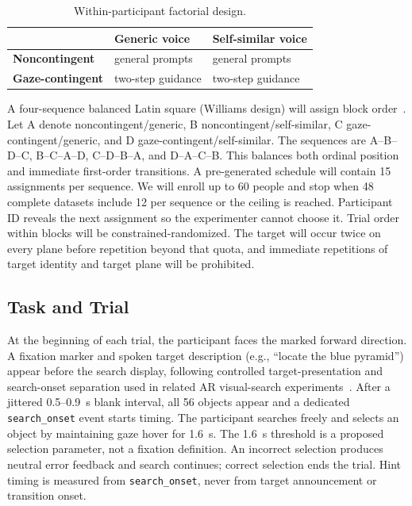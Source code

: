 \documentclass[10pt,journal,compsoc]{IEEEtran}
\begin{document}
\begin{table}[t]
\caption{Within-participant factorial design.}
\label{tab:design}
\centering
\begin{tabular}{lll}
\toprule
& \textbf{Generic voice} & \textbf{Self-similar voice} \\
\midrule
\textbf{Noncontingent} & general prompts & general prompts \\
\textbf{Gaze-contingent} & two-step guidance & two-step guidance \\
\bottomrule
\end{tabular}
\end{table}

A four-sequence balanced Latin square (Williams design) will assign block order~\cite{williams1949residual}. Let A denote noncontingent/generic, B noncontingent/self-similar, C gaze-contingent/generic, and D gaze-contingent/self-similar. The sequences are A--B--D--C, B--C--A--D, C--D--B--A, and D--A--C--B. This balances both ordinal position and immediate first-order transitions. A pre-generated schedule will contain 15 assignments per sequence. We will enroll up to 60 people and stop when 48 complete datasets include 12 per sequence or the ceiling is reached. Participant ID reveals the next assignment so the experimenter cannot choose it. Trial order within blocks will be constrained-randomized. The target will occur twice on every plane before repetition beyond that quota, and immediate repetitions of target identity and target plane will be prohibited.

\subsection{Task and Trial}
At the beginning of each trial, the participant faces the marked forward direction. A fixation marker and spoken target description (e.g., ``locate the blue pyramid'') appear before the search display, following controlled target-presentation and search-onset separation used in related AR visual-search experiments~\cite{zhang2023seehear,chiossi2024searching}. After a jittered 0.5--0.9~s blank interval, all 56 objects appear and a dedicated \texttt{search\_onset} event starts timing. The participant searches freely and selects an object by maintaining gaze hover for 1.6~s. The 1.6~s threshold is a proposed selection parameter, not a fixation definition. An incorrect selection produces neutral error feedback and search continues; correct selection ends the trial. Hint timing is measured from \texttt{search\_onset}, never from target announcement or transition onset.
\end{document}
